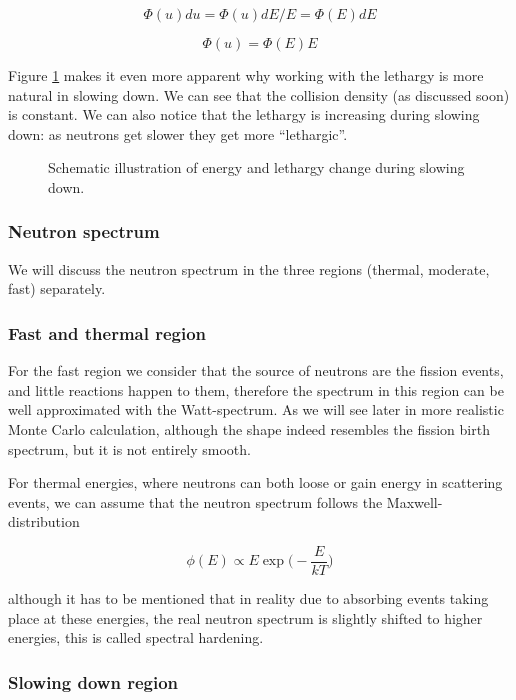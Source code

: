 $$\Phi (u)du=\Phi (u)dE/E=\Phi (E)dE$$

$$\Phi(u)=\Phi(E)E$$

Figure \ref{fig:lethargy} makes it even more apparent why working with the lethargy is more natural in slowing down. We can see that the collision density (as discussed soon) is constant. We can also notice that the lethargy is increasing during slowing down: as neutrons get slower they get more ``lethargic''.

\begin{figure}[ht!]
\protect {}\protect
\caption{\label{fig:lethargy} \footnotesize{Schematic illustration of energy and lethargy change during slowing down.}}
\end{figure}

\subsubsection{Neutron spectrum}

We will discuss the neutron spectrum in the three regions (thermal, moderate, fast) separately.

\subsubsection*{Fast and thermal region}

For the fast region we consider that the source of neutrons are the fission events, and little reactions happen to them, therefore the spectrum in this region can be well approximated with the Watt-spectrum. As we will see later in more realistic Monte Carlo calculation, although the shape indeed resembles the fission birth spectrum, but it is not entirely smooth.

For thermal energies, where neutrons can both loose or gain energy in scattering events, we can assume that the neutron spectrum follows the Maxwell-distribution

$$\phi(E)\propto E\exp\big(-\frac{E}{kT}\big)$$

\noindent although it has to be mentioned that in reality due to absorbing events taking place at these energies, the real neutron spectrum is slightly shifted to higher energies, this is called spectral hardening.

\subsubsection*{Slowing down region}


